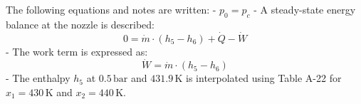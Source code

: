 The following equations and notes are written:  
- \( p_0 = p_c \)  
- A steady-state energy balance at the nozzle is described:  
\[
0 = \dot{m} \cdot (h_5 - h_6) + \dot{Q} - \dot{W}
\]
- The work term is expressed as:  
\[
\dot{W} = \dot{m} \cdot (h_5 - h_6)
\]
- The enthalpy \( h_5 \) at \( 0.5 \, \text{bar} \) and \( 431.9 \, \text{K} \) is interpolated using Table A-22 for \( x_1 = 430 \, \text{K} \) and \( x_2 = 440 \, \text{K} \).